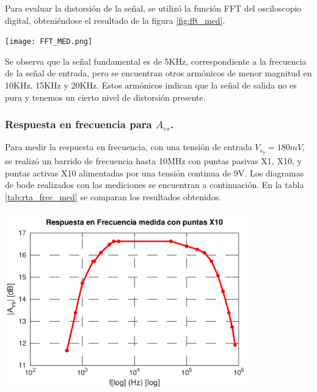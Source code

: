 \documentclass[a4paper, 10pt, spanish]{article}
\begin{document}
Para evaluar la distorsión de la señal, se utilizó la función FFT del osciloscopio digital, obteniéndose el resultado de la figura \ref{fig:fft_med}.

\begin{center}
  \texttt{[image: FFT\_MED.png]}
  \label{fig:fft_med}
\end{center}

Se observa que la señal fundamental es de 5KHz, correspondiente a la frecuencia de la señal de entrada, pero se encuentran otros armónicos de menor magnitud en 10KHz, 15KHz y 20KHz. Estos armónicos indican que la señal de salida no es pura y tenemos un cierto nivel de distorsión presente.

\subsubsection{Respuesta en frecuencia para $A_{vs}$.}
Para medir la respuesta en frecuencia, con una tensión de entrada $V_{s_p}=180mV$, se realizó un barrido de frecuencia hasta 10MHz con puntas pasivas X1, X10, y puntas activas X10 alimentadas por una tensión continua de 9V. Los diagramas de bode realizados con las mediciones se encuentran a continuación. En la tabla \ref{tab:rta_frec_med} se comparan los resultados obtenidos.

\begin{center}
  \includegraphics[width=0.8\textwidth]{X1.png}
  \label{fig:X1_med}
\end{center}
\end{document}
